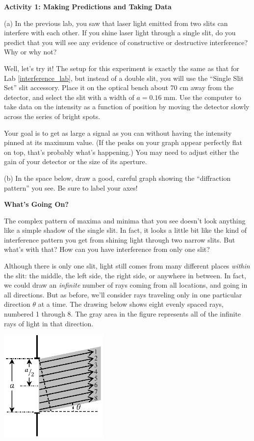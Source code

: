 \textbf{Activity 1: Making Predictions and Taking Data}

(a) In the previous lab, you saw that laser light emitted from two slits can interfere with each other.  If you shine laser light through a single slit, do you predict that you will see any evidence of constructive or destructive interference?  Why or why not?
\answerspace{0.8in}


Well, let's try it!  The setup for this experiment is exactly the same as that for Lab \ref{interference_lab},  but instead of a double slit, you will use the ``Single Slit Set'' slit accessory.  Place it on the optical bench about 70 cm away from the detector, and select the slit with a width of $a = 0.16$ mm.  Use the computer to take data on the intensity as a function of position by moving the detector slowly across the series of bright spots.  

Your goal is to get as large a signal as you can without having the intensity pinned at its maximum value.  (If the peaks on your graph appear perfectly flat on top, that's probably what's happening.) You may need to adjust either the gain of your detector or the size of its aperture.

(b) In the space below, draw a good, careful graph showing the ``diffraction pattern'' you see.  
Be sure to label your axes!
\answerspace{1.5in}

\pagebreak[2]
\textbf{What's Going On?}

The complex pattern of maxima and minima that you see doesn't look anything like a simple shadow of the single slit.  In fact, it looks a little bit like the kind of interference pattern you get from shining light through two narrow slits.  But what's with that?  How can you have interference from only one slit?

Although there is only one slit, light still comes from many different places \textit{within} the slit: the middle, the left side, the right side, or anywhere in between.  In fact, we could draw an \textit{infinite} number of rays coming from all locations, and going in all directions.  But as before, we'll consider rays traveling only in one particular direction $\theta$ at a time.  The drawing below shows eight evenly spaced rays, numbered 1 through 8.  The gray area in the figure represents all of the infinite rays of light in that direction.

\answerspace{0.2in}
\begin{center}
\includegraphics[width=0.4\textwidth]{diffraction_of_light/one_slit.eps}
\end{center}
\answerspace{0.2in}

